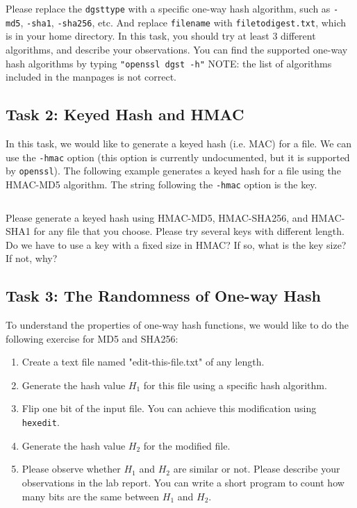 \begin{Verbatim}[frame=single] 
  % openssl dgst dgsttype filename
\end{Verbatim} 

Please replace the {\tt dgsttype} with a specific one-way hash algorithm,
such as {\tt -md5}, {\tt -sha1}, {\tt -sha256}, etc.
And replace {\tt filename} with {\tt filetodigest.txt}, which is in your home directory.
In this task, you should try at least 3 different algorithms,
and describe your observations. 
You can find the supported one-way hash algorithms 
by typing {\tt "openssl dgst -h"}  NOTE: the list of algorithms included in the manpages is not correct.


\subsection{Task 2: Keyed Hash and HMAC}

In this task, we would like to generate a keyed hash (i.e. MAC)
for a file. We can use the {\tt -hmac} option (this option 
is currently undocumented,
but it is supported by {\tt openssl}). The following example
generates a keyed hash for a file using the HMAC-MD5 
algorithm. The string following the {\tt -hmac} option
is the key. 
\begin{Verbatim}[frame=single]
 % openssl dgst -md5 -hmac "abcdefg" filename 
\end{Verbatim} 

Please generate a keyed hash using HMAC-MD5, HMAC-SHA256, and
HMAC-SHA1 for any file that you choose. Please try several
keys with different length. Do we have to use a key 
with a fixed size in HMAC? If so, what is the key size? If 
not, why?


\subsection{Task 3: The Randomness of One-way Hash}


To understand the properties of one-way hash functions, we would like to
do the following exercise for MD5 and SHA256:

\begin{enumerate}
\item Create a text file named "edit-this-file.txt" of any length.
\item Generate the hash value  $H_1$ for this file using a specific hash algorithm.
\item Flip one bit of the input file.
      You can achieve this modification using {\tt hexedit}.
\item Generate the hash value $H_2$ for the modified file.
\item Please observe whether $H_1$ and $H_2$ are similar or not. Please describe
      your observations in the lab report. You can write a short program to count
      how many bits are the same between $H_1$ and $H_2$.

\end{enumerate}


